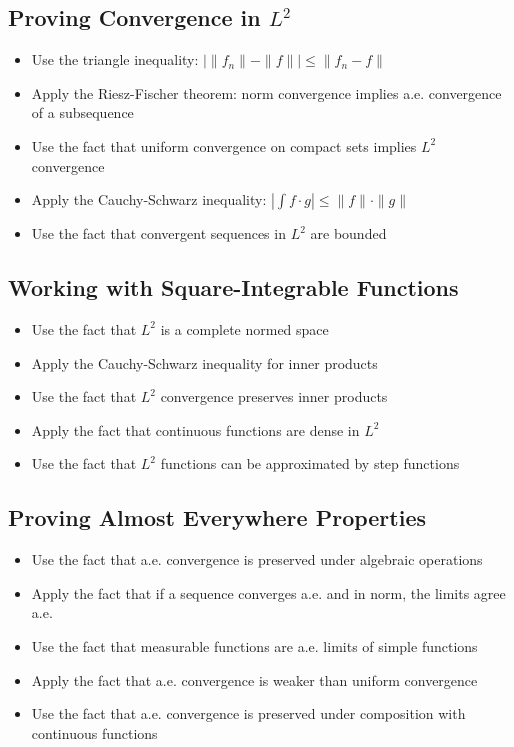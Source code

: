 \subsection*{Proving Convergence in $L^2$}
\begin{itemize}
\item Use the triangle inequality: $|\| f_n \| - \| f \|| \leq \| f_n - f \|$
\item Apply the Riesz-Fischer theorem: norm convergence implies a.e. convergence of a subsequence
\item Use the fact that uniform convergence on compact sets implies $L^2$ convergence
\item Apply the Cauchy-Schwarz inequality: $|\int f \cdot g| \leq \| f \| \cdot \| g \|$
\item Use the fact that convergent sequences in $L^2$ are bounded
\end{itemize}

\subsection*{Working with Square-Integrable Functions}
\begin{itemize}
\item Use the fact that $L^2$ is a complete normed space
\item Apply the Cauchy-Schwarz inequality for inner products
\item Use the fact that $L^2$ convergence preserves inner products
\item Apply the fact that continuous functions are dense in $L^2$
\item Use the fact that $L^2$ functions can be approximated by step functions
\end{itemize}

\subsection*{Proving Almost Everywhere Properties}
\begin{itemize}
\item Use the fact that a.e. convergence is preserved under algebraic operations
\item Apply the fact that if a sequence converges a.e. and in norm, the limits agree a.e.
\item Use the fact that measurable functions are a.e. limits of simple functions
\item Apply the fact that a.e. convergence is weaker than uniform convergence
\item Use the fact that a.e. convergence is preserved under composition with continuous functions
\end{itemize}